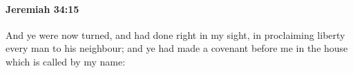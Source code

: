 
		\paragraph{Jeremiah 34:15} %
			\label{JEREMIAH-34-15}

			And ye were now turned, and had done right in my sight, in proclaiming liberty every man to his neighbour; and ye had made a covenant before me in the house which is called by my name:


